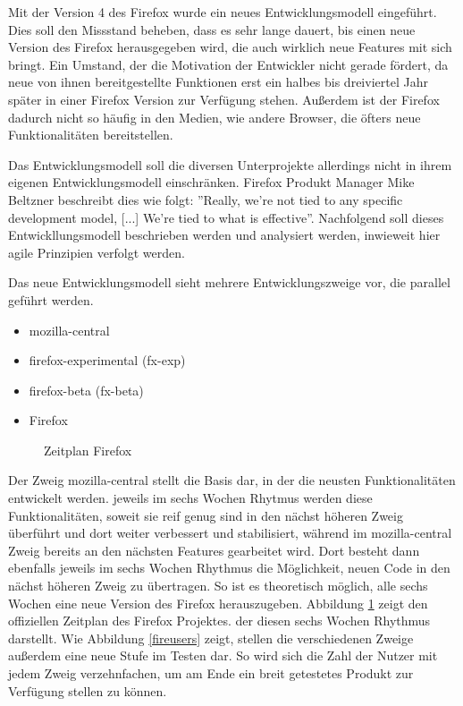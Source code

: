 Mit der Version 4 des Firefox wurde ein neues Entwicklungsmodell eingeführt. Dies soll den Missstand beheben, dass es sehr lange dauert, bis einen neue Version des Firefox herausgegeben wird, die auch wirklich neue Features mit sich bringt. Ein Umstand, der die Motivation der Entwickler nicht gerade fördert, da neue von ihnen bereitgestellte Funktionen erst ein halbes bis dreiviertel Jahr später in einer Firefox Version zur Verfügung stehen. Außerdem ist der Firefox dadurch nicht so häufig in den Medien, wie andere Browser, die öfters neue Funktionalitäten bereitstellen.

Das Entwicklungsmodell soll die diversen Unterprojekte allerdings nicht in ihrem eigenen Entwicklungsmodell einschränken. Firefox Produkt Manager Mike Beltzner beschreibt dies wie folgt: ''Really, we're not tied to any specific development model, [...] We're tied to what is effective''\cite{bib:beltzner}. Nachfolgend soll dieses Entwickllungsmodell beschrieben werden und analysiert werden, inwieweit hier agile Prinzipien verfolgt werden.

Das neue Entwicklungsmodell sieht mehrere Entwicklungszweige vor, die pa\-ra\-llel geführt werden.
\begin{itemize}
\item mozilla-central
\item firefox-experimental (fx-exp)
\item firefox-beta (fx-beta)
\item Firefox
\end{itemize}
\begin{figure}[h]
	\centering
	\caption{Zeitplan Firefox}
	\label{firett}
\end{figure}

Der Zweig mozilla-central stellt die Basis dar, in der die neusten Funktionalitäten entwickelt werden. jeweils im sechs Wochen Rhytmus werden diese Funktionalitäten, soweit sie reif genug sind in den nächst höheren Zweig überführt und dort weiter verbessert und stabilisiert, während im mozilla-central Zweig bereits an den nächsten Features gearbeitet wird. Dort besteht dann ebenfalls jeweils im sechs Wochen Rhythmus die Möglichkeit, neuen Code in den nächst höheren Zweig zu übertragen. So ist es theoretisch möglich, alle sechs Wochen eine neue Version des Firefox herauszugeben. Abbildung \ref{firett} zeigt den offiziellen Zeitplan des Firefox Projektes. der diesen sechs Wochen Rhythmus darstellt. Wie Abbildung \ref{fireusers} zeigt, stellen die verschiedenen Zweige außerdem eine neue Stufe im Testen dar. So wird sich die Zahl der Nutzer mit jedem Zweig verzehnfachen, um am Ende ein breit getestetes Produkt zur Verfügung stellen zu können.

